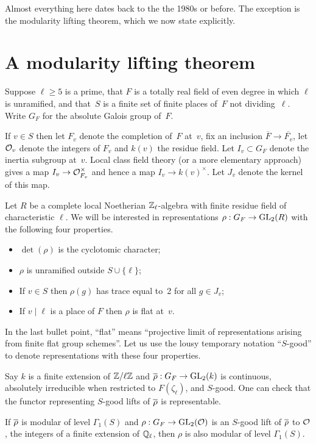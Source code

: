 Almost everything here dates back to the the 1980s or before.
The exception is the modularity lifting theorem, which we now state explicitly.

\section{A modularity lifting theorem}

Suppose $\ell\geq5$ is a prime, that $F$ is a totally real field of even degree in which $\ell$
is unramified, and that~$S$ is a finite set of finite places of~$F$ not dividing~$\ell$. Write
$G_F$ for the absolute Galois group of~$F$.

If $v\in S$ then let $F_v$ denote the completion of~$F$ at~$v$, fix an inclusion $\overline{F}\to\overline{F_v}$,
let $\mathcal{O}_v$ denote the integers of $F_v$ and $k(v)$ the residue field. Let $I_v\subset G_F$ denote the inertia 
subgroup at~$v$. Local class field theory (or a more elementary approach) gives a map $I_v\to\mathcal{O}_{F_v}^\times$
and hence a map $I_v\to k(v)^\times$. Let $J_v$ denote the kernel of this map.

Let $R$ be a complete local Noetherian $\mathbb{Z}_\ell$-algebra with finite residue field of characteristic $\ell$.
We will be interested in representations $\rho:G_F\to\operatorname{GL}_2(R)$ with the following four properties.
\begin{itemize}
    \item $\det(\rho)$ is the cyclotomic character;
    \item $\rho$ is unramified outside $S\cup\{\ell\}$;
    \item If $v\in S$ then $\rho(g)$ has trace equal to~2 for all $g\in J_v$;
    \item If $v\mid\ell$ is a place of $F$ then $\rho$ is flat at~$v$.
\end{itemize}

In the last bullet point, ``flat'' means ``projective limit of representations arising from
finite flat group schemes''. Let us use the lousy temporary notation ``$S$-good'' to denote
representations with these four properties.

Say $k$ is a finite extension of $\mathbb{Z}/\ell\mathbb{Z}$ and $\overline{\rho}:G_F\to\operatorname{GL}_2(k)$ is continuous,
absolutely irreducible when restricted to $F(\zeta_\ell)$, and $S$-good. One can check
that the functor representing $S$-good lifts of $\overline{\rho}$ is representable.

\begin{theorem}\label{modularity_lifting_theorem}\notready
        If $\overline{\rho}$ is modular of level $\Gamma_1(S)$ and $\rho:G_F\to\operatorname{GL}_2(\mathcal{O})$ is
        an $S$-good lift of $\overline{\rho}$ to $\mathcal{O}$, the integers of a finite extension of $\mathbb{Q}_\ell$,
        then $\rho$ is also modular of level $\Gamma_1(S)$.
\end{theorem}

